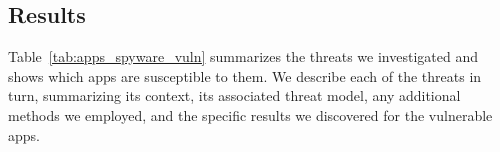 \documentclass[sigconf,balance=false]{acmart}
\newcommand{\geoff}[1]{\textcolor{purple}{\noindent[GV: #1]}}
\newcommand{\geoff}[1]{}
\begin{document}



\subsection{Results}

Table~\ref{tab:apps_spyware_vuln} summarizes the threats we
investigated and shows which apps are susceptible to them.
%
We describe each of the threats in turn, summarizing its context, its
associated threat model, any additional methods we employed, and the
specific results we discovered for the vulnerable apps.

\end{document}
